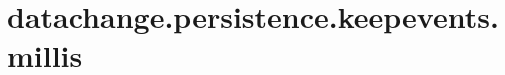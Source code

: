 \section{datachange.persistence.keepevents.millis}
\label{configuration:DatachangePersistenceKeepeventsMillis}
\TODO

